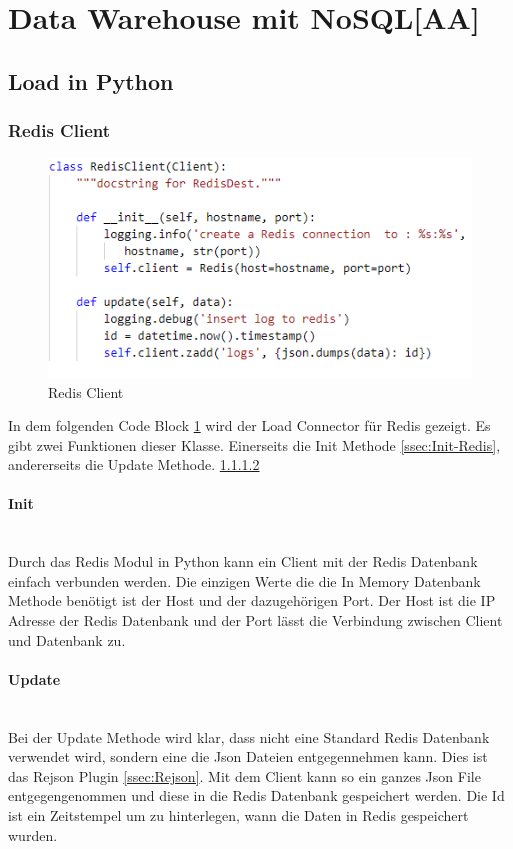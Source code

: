 \newpage
\section{Data Warehouse mit NoSQL[AA]}
\subsection{Load in Python}
\subsubsection{Redis Client}
\begin{figure}[H]
\centering
  \includegraphics[scale=0.8]{images/RedisClient.PNG}
  \caption[Redis Client]{Redis Client}
  \label{fig:Redis-Client}
\end{figure}
In dem folgenden Code Block \ref{fig:Redis-Client} wird der Load Connector für Redis gezeigt. Es gibt zwei Funktionen dieser Klasse. Einerseits die Init Methode \ref{ssec:Init-Redis}, andererseits die Update Methode. \ref{ssec:Update-Redis}\\
\paragraph{Init}\mbox{}\label{ssec:Init-Redis} \\
Durch das Redis Modul in Python kann ein Client mit der Redis Datenbank einfach verbunden werden. Die einzigen Werte die die In Memory Datenbank Methode benötigt ist der Host und der dazugehörigen Port. Der Host ist die IP Adresse der Redis Datenbank und der Port lässt die Verbindung zwischen Client und 
Datenbank zu.\\
\paragraph{Update}\label{ssec:Update-Redis}\mbox{} \\
Bei der Update Methode wird klar, dass nicht eine Standard Redis Datenbank verwendet wird, sondern eine die Json Dateien entgegennehmen kann. Dies ist das Rejson Plugin \ref{ssec:Rejson}. Mit dem Client kann so ein ganzes Json File entgegengenommen und diese in die Redis Datenbank gespeichert werden. Die Id ist ein Zeitstempel um zu hinterlegen, wann die Daten in Redis gespeichert wurden.  
\newpage
